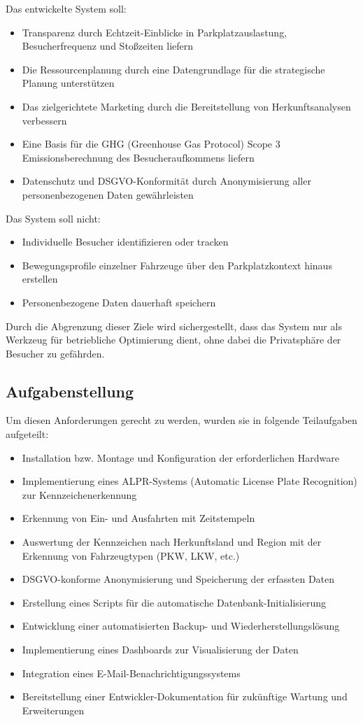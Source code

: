Das entwickelte System soll:
\begin{itemize}
    \item Transparenz durch Echtzeit-Einblicke in Parkplatzauslastung, Besucherfrequenz und Stoßzeiten liefern
    \item Die Ressourcenplanung durch eine Datengrundlage für die strategische Planung unterstützen
    \item Das zielgerichtete Marketing durch die Bereitstellung von Herkunftsanalysen verbessern
    \item Eine Basis für die GHG (Greenhouse Gas Protocol) Scope 3 Emissionsberechnung des Besucheraufkommens liefern \cite{ghg_scope3}
    \item Datenschutz und DSGVO-Konformität durch Anonymisierung aller personenbezogenen Daten gewährleisten
\end{itemize}

Das System soll nicht:
\begin{itemize}
    \item Individuelle Besucher identifizieren oder tracken
    \item Bewegungsprofile einzelner Fahrzeuge über den Parkplatzkontext hinaus erstellen
    \item Personenbezogene Daten dauerhaft speichern
\end{itemize}

Durch die Abgrenzung dieser Ziele wird sichergestellt, dass das System nur als Werkzeug für betriebliche Optimierung dient, ohne dabei die Privatsphäre der Besucher zu gefährden.

\newpage
\subsection{Aufgabenstellung}
\label{sec:aufgabenstellung}

Um diesen Anforderungen gerecht zu werden, wurden sie in folgende Teilaufgaben aufgeteilt:
\begin{itemize}
    \item Installation bzw. Montage und Konfiguration der erforderlichen Hardware
    \item Implementierung eines ALPR-Systems (Automatic License Plate Recognition) zur Kennzeichenerkennung
    \item Erkennung von Ein- und Ausfahrten mit Zeitstempeln
    \item Auswertung der Kennzeichen nach Herkunftsland und Region mit der Erkennung von Fahrzeugtypen (PKW, LKW, etc.)
    \item DSGVO-konforme Anonymisierung und Speicherung der erfassten Daten
    \item Erstellung eines Scripts für die automatische Datenbank-Initialisierung
    \item Entwicklung einer automatisierten Backup- und Wiederherstellungslösung
    \item Implementierung eines Dashboards zur Visualisierung der Daten
    \item Integration eines E-Mail-Benachrichtigungssystems
    \item Bereitstellung einer Entwickler-Dokumentation für zukünftige Wartung und Erweiterungen
\end{itemize}


